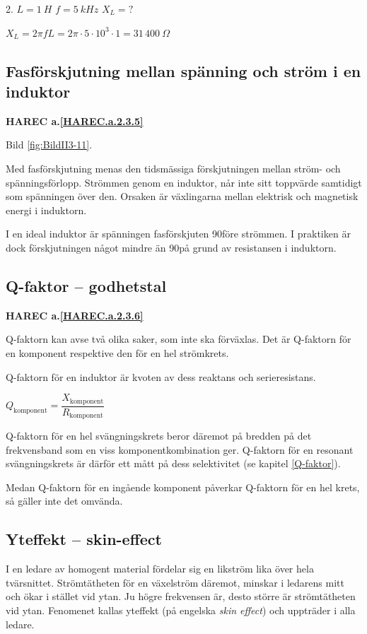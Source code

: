 2. \(L = 1\ H\) \(f = 5\ kHz\) \(X_L = ?\)

\(X_L = 2\pi fL = 2\pi  \cdot 5 \cdot 10^3 \cdot 1 = 31\, 400\ \Omega\)

\subsection{Fasförskjutning mellan spänning och ström i en induktor}
\textbf{HAREC a.\ref{HAREC.a.2.3.5}\label{myHAREC.a.2.3.5}}

Bild \ref{fig:BildII3-11}.

Med fasförskjutning menas den tidsmässiga förskjutningen mellan ström- och
spänningsförlopp. Strömmen genom en induktor, når inte sitt toppvärde samtidigt
som spänningen över den. Orsaken är växlingarna mellan elektrisk och magnetisk
energi i induktorn.

I en ideal induktor är spänningen fasförskjuten 90\degree före strömmen. I praktiken
är dock förskjutningen något mindre än 90\degree på grund av resistansen i induktorn.

\subsection{Q-faktor -- godhetstal}
\textbf{HAREC a.\ref{HAREC.a.2.3.6}\label{myHAREC.a.2.3.6}}

Q-faktorn kan avse två olika saker, som inte ska förväxlas. Det är Q-faktorn
för en komponent respektive den för en hel strömkrets.

Q-faktorn för en induktor är kvoten av dess reaktans och serieresistans.

\(Q_\text{komponent} = \dfrac{X_\text{komponent}}{R_\text{komponent}}\)

Q-faktorn för en hel svängningskrets beror däremot på bredden på det
frekvensband som en viss komponentkombination ger. Q-faktorn för en resonant
svängningskrets är därför ett mått på dess selektivitet (se kapitel \ref{Q-faktor}).

Medan Q-faktorn för en ingående komponent påverkar Q-faktorn för en hel krets,
så gäller inte det omvända.

\subsection{Yteffekt -- skin-effect}

I en ledare av homogent material fördelar sig en likström lika över hela
tvärsnittet. Strömtätheten för en växelström däremot, minskar i ledarens mitt
och ökar i stället vid ytan. Ju högre frekvensen är, desto större är
strömtätheten vid ytan. Fenomenet kallas yteffekt (på engelska
\emph{skin effect}) och uppträder i alla ledare.

